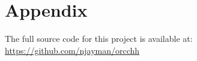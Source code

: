 \hypertarget{appendix}{%
\section{Appendix}\label{appendix}}

The full source code for this project is available at:
\url{https://github.com/njayman/orcchh}
